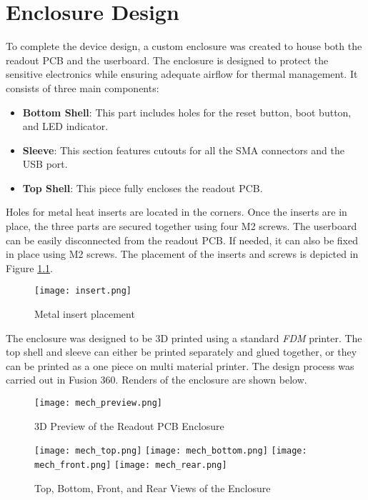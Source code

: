 \chapter{Enclosure Design}
To complete the device design, a custom enclosure was created to house both the readout PCB and the userboard. The enclosure is designed to protect the sensitive electronics while ensuring adequate airflow for thermal management. It consists of three main components: 

\begin{itemize}
    \item \textbf{Bottom Shell}: This part includes holes for the reset button, boot button, and LED indicator.
    \item \textbf{Sleeve}: This section features cutouts for all the SMA connectors and the USB port.
    \item \textbf{Top Shell}: This piece fully encloses the readout PCB.
\end{itemize}

Holes for metal heat inserts are located in the corners. Once the inserts are in place, the three parts are secured together using four M2 screws. The userboard can be easily disconnected from the readout PCB. If needed, it can also be fixed in place using M2 screws. The placement of the inserts and screws is depicted in Figure \ref{fig:readout_inserts}.

\FloatBarrier
\begin{figure}[htp!]
    \centering
    \texttt{[image: insert.png]}
    \caption{Metal insert placement}
    \label{fig:readout_inserts}
\end{figure}
\FloatBarrier

The enclosure was designed to be 3D printed using a standard \emph{FDM} printer. The top shell and sleeve can either be printed separately and glued together, or they can be printed as a one piece on multi material printer. The design process was carried out in Fusion 360. Renders of the enclosure are shown below.


\FloatBarrier
\begin{figure}[htp!]
    \centering
    \texttt{[image: mech\_preview.png]}
    \caption{3D Preview of the Readout PCB Enclosure}
    \label{fig:readout_3d_preview}
\end{figure}
\FloatBarrier

\FloatBarrier
\begin{figure}[htp!]
    \centering
    \texttt{[image: mech\_top.png]}
    \texttt{[image: mech\_bottom.png]}
    \texttt{[image: mech\_front.png]}
    \texttt{[image: mech\_rear.png]}
    \caption{Top, Bottom, Front, and Rear Views of the Enclosure}
    \label{fig:readout_3d_views}
\end{figure}
\FloatBarrier
